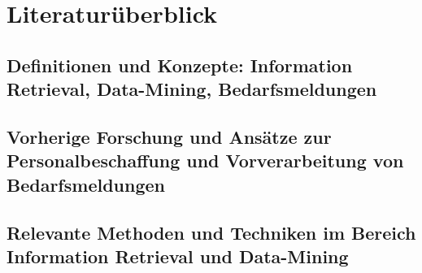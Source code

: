 \chapter{Literaturüberblick}
\label{chap:literaturüberblick}

\section{Definitionen und Konzepte: Information Retrieval, Data-Mining, Bedarfsmeldungen}
\label{sec:definitionen-konzepte}

\section{Vorherige Forschung und Ansätze zur Personalbeschaffung und Vorverarbeitung von Bedarfsmeldungen}
\label{sec:forschung-und-ansätze}

\section{Relevante Methoden und Techniken im Bereich Information Retrieval und Data-Mining}
\label{sec:relevante-methoden}
\newpage





